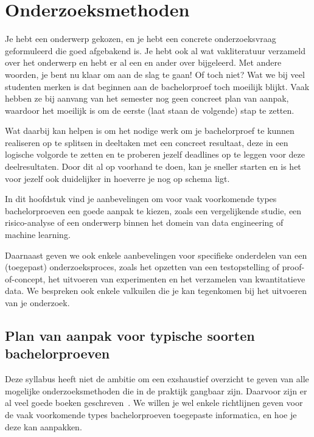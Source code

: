 \chapter{Onderzoeksmethoden}%
\label{ch:onderzoeksmethoden}

Je hebt een onderwerp gekozen, en je hebt een concrete onderzoeksvraag geformuleerd die goed afgebakend is. Je hebt ook al wat vakliteratuur verzameld over het onderwerp en hebt er al een en ander over bijgeleerd. Met andere woorden, je bent nu klaar om aan de slag te gaan! Of toch niet? Wat we bij veel studenten merken is dat beginnen aan de bachelorproef toch moeilijk blijkt. Vaak hebben ze bij aanvang van het semester nog geen concreet plan van aanpak, waardoor het moeilijk is om de eerste (laat staan de volgende) stap te zetten.

Wat daarbij kan helpen is om het nodige werk om je bachelorproef te kunnen realiseren op te splitsen in deeltaken met een concreet resultaat, deze in een logische volgorde te zetten en te proberen jezelf deadlines op te leggen voor deze deelresultaten. Door dit al op voorhand te doen, kan je sneller starten en is het voor jezelf ook duidelijker in hoeverre je nog op schema ligt.

In dit hoofdstuk vind je aanbevelingen om voor vaak voorkomende types bachelorproeven een goede aanpak te kiezen, zoals een vergelijkende studie, een risico-analyse of een onderwerp binnen het domein van data engineering of machine learning.

Daarnaast geven we ook enkele aanbevelingen voor specifieke onderdelen van een (toegepast) onderzoeksproces, zoals het opzetten van een testopstelling of proof-of-concept, het uitvoeren van experimenten en het verzamelen van kwantitatieve data. We bespreken ook enkele valkuilen die je kan tegenkomen bij het uitvoeren van je onderzoek.

\section{Plan van aanpak voor typische soorten bachelorproeven}%
\label{sec:plan-van-aanpak}

Deze syllabus heeft niet de ambitie om een exshaustief overzicht te geven van alle mogelijke onderzoeksmethoden die in de praktijk gangbaar zijn. Daarvoor zijn er al veel goede boeken geschreven~\autocite{Saunders2024}. We willen je wel enkele richtlijnen geven voor de vaak voorkomende types bachelorproeven toegepaste informatica, en hoe je deze kan aanpakken.

